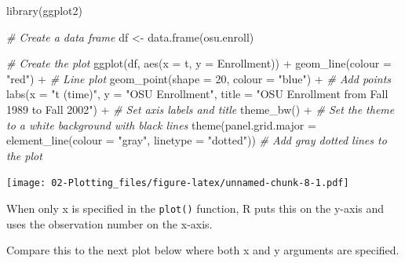 \documentclass[
]{book}
\newenvironment{Shaded}{\begin{snugshade}}{\end{snugshade}}
\newcommand{\AttributeTok}[1]{\textcolor[rgb]{0.77,0.63,0.00}{#1}}
\newcommand{\CommentTok}[1]{\textcolor[rgb]{0.56,0.35,0.01}{\textit{#1}}}
\newcommand{\DecValTok}[1]{\textcolor[rgb]{0.00,0.00,0.81}{#1}}
\newcommand{\FunctionTok}[1]{\textcolor[rgb]{0.00,0.00,0.00}{#1}}
\newcommand{\NormalTok}[1]{#1}
\newcommand{\OtherTok}[1]{\textcolor[rgb]{0.56,0.35,0.01}{#1}}
\newcommand{\SpecialCharTok}[1]{\textcolor[rgb]{0.00,0.00,0.00}{#1}}
\newcommand{\StringTok}[1]{\textcolor[rgb]{0.31,0.60,0.02}{#1}}
\theoremstyle{definition}
\theoremstyle{definition}
\theoremstyle{definition}
\theoremstyle{definition}
\theoremstyle{remark}
\begin{document}
\begin{Shaded}
\begin{Highlighting}[]
\FunctionTok{library}\NormalTok{(ggplot2)}

\CommentTok{\# Create a data frame}
\NormalTok{df }\OtherTok{\textless{}{-}} \FunctionTok{data.frame}\NormalTok{(osu.enroll)}

\CommentTok{\# Create the plot}
\FunctionTok{ggplot}\NormalTok{(df, }\FunctionTok{aes}\NormalTok{(}\AttributeTok{x =}\NormalTok{ t, }\AttributeTok{y =}\NormalTok{ Enrollment)) }\SpecialCharTok{+}
  \FunctionTok{geom\_line}\NormalTok{(}\AttributeTok{colour =} \StringTok{"red"}\NormalTok{) }\SpecialCharTok{+}  \CommentTok{\# Line plot}
  \FunctionTok{geom\_point}\NormalTok{(}\AttributeTok{shape =} \DecValTok{20}\NormalTok{, }\AttributeTok{colour =} \StringTok{"blue"}\NormalTok{) }\SpecialCharTok{+}  \CommentTok{\# Add points}
  \FunctionTok{labs}\NormalTok{(}\AttributeTok{x =} \StringTok{"t (time)"}\NormalTok{, }\AttributeTok{y =} \StringTok{"OSU Enrollment"}\NormalTok{, }
       \AttributeTok{title =} \StringTok{"OSU Enrollment from Fall 1989 to Fall 2002"}\NormalTok{) }\SpecialCharTok{+}  \CommentTok{\# Set axis labels and title}
  \FunctionTok{theme\_bw}\NormalTok{() }\SpecialCharTok{+}  \CommentTok{\# Set the theme to a white background with black lines}
  \FunctionTok{theme}\NormalTok{(}\AttributeTok{panel.grid.major =} \FunctionTok{element\_line}\NormalTok{(}\AttributeTok{colour =} \StringTok{"gray"}\NormalTok{, }\AttributeTok{linetype =} \StringTok{"dotted"}\NormalTok{))  }\CommentTok{\# Add gray dotted lines to the plot}
\end{Highlighting}
\end{Shaded}

\texttt{[image: 02-Plotting\_files/figure-latex/unnamed-chunk-8-1.pdf]}

When only x is specified in the \texttt{plot()} function, R puts this on the y-axis and uses the observation number on the x-axis.

Compare this to the next plot below where both x and y arguments are specified.
\end{document}
